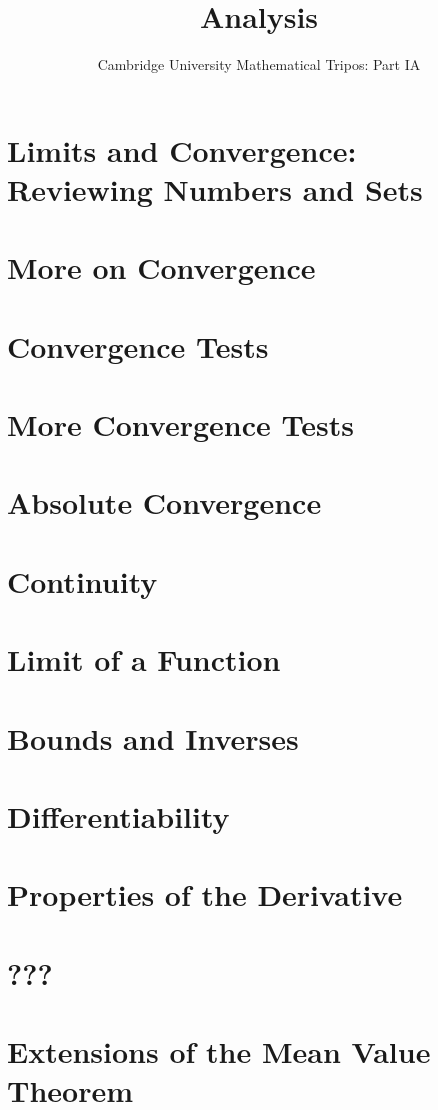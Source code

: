 \documentclass{article}
\title{Analysis}
\author{Cambridge University Mathematical Tripos: Part IA}
\begin{document}
\maketitle

\tableofcontentsnewpage{}

\section{Limits and Convergence: Reviewing Numbers and Sets}

\section{More on Convergence}

\section{Convergence Tests}

\section{More Convergence Tests}

\section{Absolute Convergence}

\section{Continuity}

\section{Limit of a Function}

\section{Bounds and Inverses}

\section{Differentiability}

\section{Properties of the Derivative}

\section{???}

\section{Extensions of the Mean Value Theorem}

\end{document}
